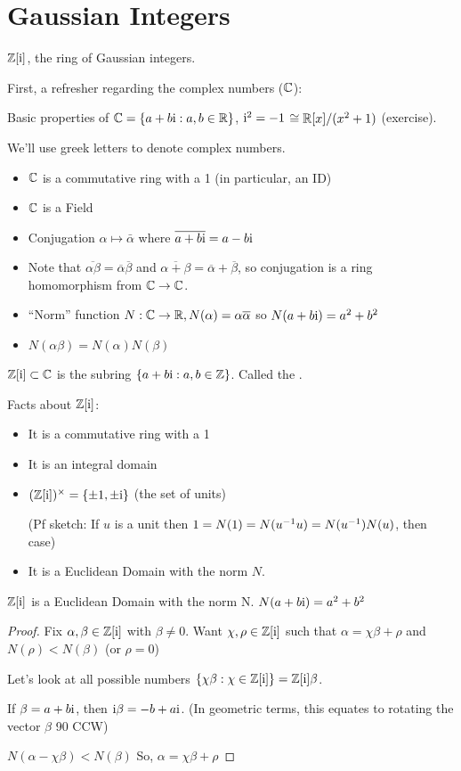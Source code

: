 \documentclass[notes.tex]{subfiles}
\begin{document}
\section*{Gaussian Integers}
	$\mathbb{Z}[\mathrm{i}]$, the ring of Gaussian integers. 

	First, a refresher regarding the complex numbers ($\mathbb{C}$):
	\begin{tabin}
		Basic properties of $\mathbb{C} = \{a + b\mathrm{i}: a,b\in\mathbb{R}\}$, $\mathrm{i}^2=-1$
		$\cong \mathbb{R}[x]/(x^2+1)$ (exercise).

		We'll use greek letters to denote complex numbers.
		\begin{itemize}
			\item $\mathbb{C}$ is a commutative ring with a 1 (in particular, an ID)
			\item $\mathbb{C}$ is a Field 
			\item Conjugation $\alpha\mapsto \bar\alpha$ where $\overline{a+b\mathrm{i}} = a-b\mathrm{i}$
			\item Note that $\overline{\alpha \beta} = \overline \alpha\overline \beta$ and $\overline{\alpha+\beta} = \overline{\alpha} + \overline{\beta}$, so conjugation is a ring homomorphism from $\mathbb{C}\to\mathbb{C}$.
			\item ``Norm'' function $N:\mathbb{C}\to\mathbb{R}, N(\alpha)=\alpha\overline\alpha$ so $N(a+b\mathrm{i}) = a^2 + b^2$
			\item $N(\alpha \beta) = N(\alpha)N(\beta)$
		\end{itemize}
	\end{tabin}

	\begin{defn}
		$\mathbb{Z}[\mathrm{i}]\subset\mathbb{C}$ is the subring $\{a+b\mathrm{i}:a,b\in\mathbb{Z}\}$.
		Called the .
	\end{defn}
	Facts about $\mathbb{Z}[\mathrm{i}]$:
	\begin{itemize}
		\item It is a commutative ring with a 1
		\item It is an integral domain
		\item $(\mathbb{Z}[\mathrm{i}])^\times = \{\pm1, \pm\mathrm{i}\}$ (the set of units)

			(Pf sketch: If $u$ is a unit then $1 = N(1) = N({u}^{-1}u) = N({u}^{-1})N(u)$, then case)
		\item It is a Euclidean Domain with the norm $N$.
	\end{itemize}
	\begin{proposition}
		$\mathbb{Z}[\mathrm{i}]$ is a Euclidean Domain with the norm N. $N(a+b\mathrm{i}) = a^2+b^2$
	\end{proposition}
	\begin{proof}
		Fix $\alpha,\beta\in \mathbb{Z}[\mathrm{i}]$ with $\beta\ne 0$. Want $\chi, \rho\in\mathbb{Z}[\mathrm{i}]$ such that $\alpha=\chi \beta + \rho$ and $N(\rho) < N(\beta)$ (or $\rho=0$)

		Let's look at all possible numbers $\{\chi \beta : \chi\in\mathbb{Z}[\mathrm{i}]\} = \mathbb{Z}[\mathrm{i}]\beta$.

		If $\beta=a+b\mathrm{i}$, then $\mathrm{i} \beta = -b + a\mathrm{i}$. (In geometric terms, this equates to rotating the vector $\beta$ 90\textdegree\xspace CCW)

		$N(\alpha - \chi \beta)< N(\beta)$ So, $\alpha=\chi \beta+\rho$
	\end{proof}
\end{document}
